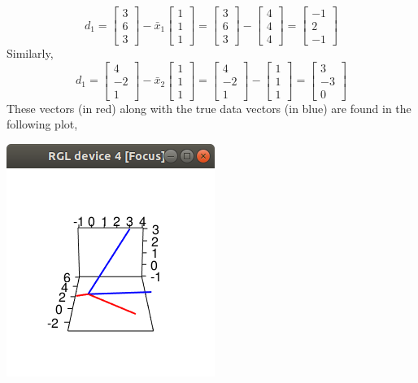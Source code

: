 \documentclass[letterpaper,10pt]{article}
\begin{document}
\begin{description}
\begin{enumerate}[label=\alph*.]
\[d_1=\begin{bmatrix}
3\\6\\3
\end{bmatrix}-\bar{x}_1\begin{bmatrix}
1\\1\\1
\end{bmatrix}=\begin{bmatrix}
3\\6\\3
\end{bmatrix}-\begin{bmatrix}
4\\4\\4
\end{bmatrix}=\begin{bmatrix}
-1\\2\\-1
\end{bmatrix} \]
Similarly,
\[d_1=\begin{bmatrix}
4\\-2\\1
\end{bmatrix}-\bar{x}_2\begin{bmatrix}
1\\1\\1
\end{bmatrix}=\begin{bmatrix}
4\\-2\\1
\end{bmatrix}-\begin{bmatrix}
1\\1\\1
\end{bmatrix}=\begin{bmatrix}
3\\-3\\0
\end{bmatrix}\]
These vectors (in red) along with the true data vectors (in blue) are found in the following plot,
\begin{center}
\includegraphics[scale=1]{32b.png}

\end{center}
\end{enumerate}
\end{description}
\end{document}
